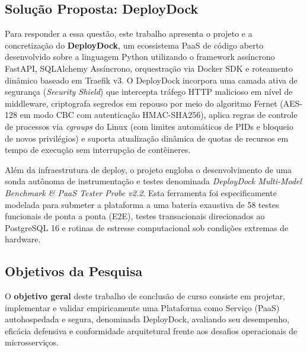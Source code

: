 \subsection{Solução Proposta: DeployDock}
\label{sec:solucao-proposta}

Para responder a essa questão, este trabalho apresenta o projeto e a concretização do \textbf{DeployDock}, um ecossistema PaaS de código aberto desenvolvido sobre a linguagem Python utilizando o framework assíncrono FastAPI, SQLAlchemy Assíncrono, orquestração via Docker SDK e roteamento dinâmico baseado em Traefik v3. O DeployDock incorpora uma camada ativa de segurança (\textit{Security Shield}) que intercepta tráfego HTTP malicioso em nível de middleware, criptografa segredos em repouso por meio do algoritmo Fernet (AES-128 em modo CBC com autenticação HMAC-SHA256), aplica regras de controle de processos via \textit{cgroups} do Linux (com limites automáticos de PIDs e bloqueio de novos privilégios) e suporta atualização dinâmica de quotas de recursos em tempo de execução sem interrupção de contêineres.

Além da infraestrutura de deploy, o projeto engloba o desenvolvimento de uma sonda autônoma de instrumentação e testes denominada \textit{DeployDock Multi-Model Benchmark \& PaaS Tester Probe v2.2}. Esta ferramenta foi especificamente modelada para submeter a plataforma a uma bateria exaustiva de 58 testes funcionais de ponta a ponta (E2E), testes transacionais direcionados ao PostgreSQL 16 e rotinas de estresse computacional sob condições extremas de hardware.

\subsection{Objetivos da Pesquisa}
\label{sec:objetivos}

O \textbf{objetivo geral} deste trabalho de conclusão de curso consiste em projetar, implementar e validar empiricamente uma Plataforma como Serviço (PaaS) autohospedada e segura, denominada DeployDock, avaliando seu desempenho, eficácia defensiva e conformidade arquitetural frente aos desafios operacionais de microsserviços.

